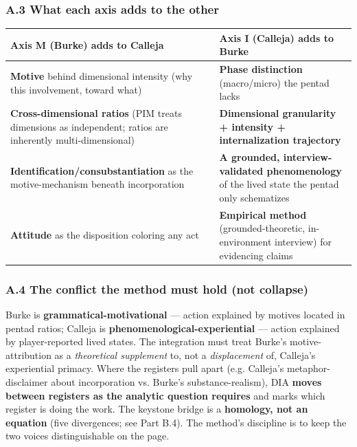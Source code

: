 \documentclass[11pt]{report}
\begin{document}
\subsubsection{A.3 What each axis adds to the other}


\begin{table}[H]
\renewcommand{\arraystretch}{1.25}
\begin{tabularx}{\textwidth}{>{\RaggedRight\arraybackslash}X>{\RaggedRight\arraybackslash}X}
\toprule
Axis M (Burke) adds to Calleja & Axis I (Calleja) adds to Burke \\
\midrule
\textbf{Motive} behind dimensional intensity (why this involvement, toward what) & \textbf{Phase distinction} (macro/micro) the pentad lacks \\
\textbf{Cross-dimensional ratios} (PIM treats dimensions as independent; ratios are inherently multi-dimensional) & \textbf{Dimensional granularity + intensity + internalization trajectory} \\
\textbf{Identification/consubstantiation} as the motive-mechanism beneath incorporation & \textbf{A grounded, interview-validated phenomenology} of the lived state the pentad only schematizes \\
\textbf{Attitude} as the disposition coloring any act & \textbf{Empirical method} (grounded-theoretic, in-environment interview) for evidencing claims \\
\bottomrule
\end{tabularx}
\end{table}


\subsubsection{A.4 The conflict the method must hold (not collapse)}


Burke is \textbf{grammatical-motivational} — action explained by motives located in pentad ratios; Calleja is \textbf{phenomenological-experiential} — action explained by player-reported lived states. The integration must treat Burke's motive-attribution as a \textit{theoretical supplement} to, not a \textit{displacement} of, Calleja's experiential primacy. Where the registers pull apart (e.g. Calleja's metaphor-disclaimer about incorporation vs. Burke's substance-realism), DIA \textbf{moves between registers as the analytic question requires} and marks which register is doing the work. The keystone bridge is a \textbf{homology, not an equation} (five divergences; see Part B.4). The method's discipline is to keep the two voices distinguishable on the page.
\end{document}
